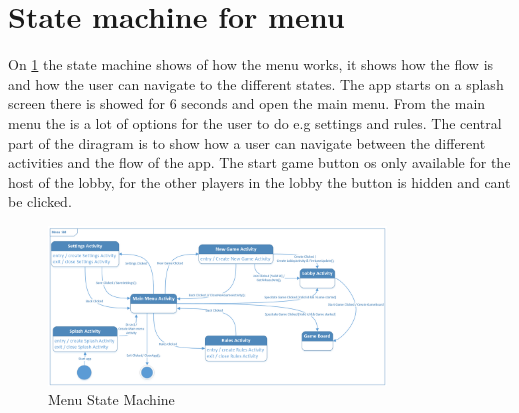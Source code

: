 \section{State machine for menu}

On \ref{StateMachine} the state machine shows of how the  menu works, it shows how the flow is and how the user can navigate to the different states. The app starts on a splash screen there is showed for 6 seconds and open the main menu. From the main menu the is a lot of options for the user to do e.g settings and rules. The central part of the diragram is to show how a user can navigate between the different activities and the flow of the app. The start game button os only available for the host of the lobby, for the other players in the lobby the button is hidden and cant be clicked.

\begin{figure}
	\centering
	\includegraphics[width=0.8\textwidth]{images/Menu_State_Machine.png}
	\caption{Menu State Machine \label{StateMachine}}
\end{figure}